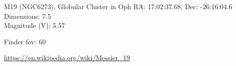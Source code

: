 \begin{block}{M19 (NGC6273), Globular Cluster in Oph}
    RA: 17:02:37.68, Dec: -26:16:04.6 \\ 
    Dimensions: 7.5 \\ 
    Magnitude (V): 5.57



    Finder fov: 60 

    \url{https://en.wikipedia.org/wiki/Messier_19} 
\end{block}